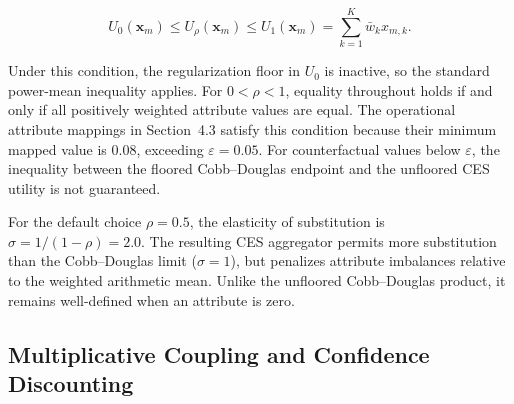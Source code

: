 \documentclass[pdflatex,sn-mathphys-num]{sn-jnl}
\theoremstyle{thmstyleone}
\theoremstyle{thmstylethree}
\begin{document}
\begin{equation}\label{eq:jensen}
U_0(\mathbf{x}_m) \leq U_{\rho}(\mathbf{x}_m)
\leq U_1(\mathbf{x}_m)
= \sum_{k=1}^{K} \bar{w}_k x_{m,k}.
\end{equation}

Under this condition, the regularization floor in $U_0$ is inactive,
so the standard power-mean inequality applies. For $0 < \rho < 1$,
equality throughout holds if and only if all positively weighted
attribute values are equal. The operational attribute mappings in
Section~4.3 satisfy this condition because their minimum mapped
value is $0.08$, exceeding $\varepsilon = 0.05$. For counterfactual
values below $\varepsilon$, the inequality between the floored
Cobb--Douglas endpoint and the unfloored CES utility is not
guaranteed.

For the default choice $\rho = 0.5$, the elasticity of substitution
is $\sigma = 1/(1-\rho) = 2.0$. The resulting CES aggregator permits
more substitution than the Cobb--Douglas limit ($\sigma = 1$), but
penalizes attribute imbalances relative to the weighted arithmetic
mean. Unlike the unfloored Cobb--Douglas product, it remains
well-defined when an attribute is zero.
\subsection{Multiplicative Coupling and Confidence Discounting}\label{subsec:coupling}
\end{document}
